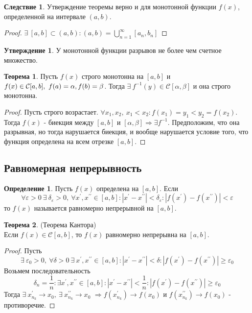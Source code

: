 \documentclass[a4paper, 12pt]{article}
\renewcommand{\epsilon}{\varepsilon}
\theoremstyle{definition}
\newtheorem*{definition}{Определение}
\newtheorem*{theorem}{Теорема}
\newtheorem*{consequense}{Следствие}
\newtheorem*{statement}{Утверждение}
\begin{document}
        \begin{consequense}
            Утверждение теоремы верно и для монотонной функции $f(x)$, определенной на интервале $(a,b)$.
        \end{consequense} 
        \begin{proof}
            $\exists\ [a,b]\subset (a,b): (a,b)=\bigcup\limits_{n=1}^{\infty}[a_n,b_n]$
        \end{proof}
        \begin{statement}
            У монотонной функции разрывов не более чем счетное множество.
        \end{statement} 
        \begin{theorem}
            Пусть $f(x)$ строго монотонна на $[a,b]$ и $f(x)\in\mathcal{C}[a,b],\ f(a)=\alpha,\\
            f(b)=\beta$. Тогда $\exists\ f^{-1}(y)\in\mathcal{C}[\alpha,\beta]$ и она строго монотонна. 
        \end{theorem} 
        \begin{proof}
            Пусть строго возрастает. $\forall x_1,x_2,\ x_1<x_2: f(x_1)=y_1<y_2=f(x_2)$. Тогда $f(x)$ - биекция между $[a,b]$ и $[\alpha,\beta] \Rightarrow \exists f^{-1}$. Предположим, что она разрывная, но тогда нарушается биекция, и вообще нарушается условие того, что функция определена на всем отрезке $[a,b]$.
        \end{proof} 
    \subsection{Равномерная непрерывность}
        \begin{definition}
            Пусть $f(x)$ определена на $[a,b]$. Если 
            \[\forall \epsilon>0\ \exists\ \delta_{\epsilon}>0,\ \forall x^{\prime}, x^{\prime\prime}\in [a,b]: |x^{\prime}-x^{\prime\prime}|<\delta_{\epsilon}: |f(x^{\prime})-f(x^{\prime\prime})|<\epsilon\] 
            то $f(x)$ называется равномерно непрерывной на $[a,b]$.
        \end{definition} 
        \begin{theorem} (Теорема Кантора)\\
            Если $f(x)\in \mathcal{C}[a,b]$, то $f(x)$ равномерно непрерывна на $[a,b]$.
        \end{theorem} 
        \begin{proof}
            Пусть 
            \[\exists\ \epsilon_0>0,\ \forall \delta>0\ \exists\ x^{\prime}, x^{\prime\prime}\in [a,b]: |x^{\prime}-x^{\prime\prime}|<\delta: |f(x^{\prime})-f(x^{\prime\prime})|\geq \epsilon_0\] 
            Возьмем последовательность 
            \[\delta_n=\frac{1}{n}: \exists x^{\prime},x^{\prime\prime}\in [a,b]: |x^{\prime}-x^{\prime\prime}|<\frac{1}{n}: |f(x^{\prime})-f(x^{\prime\prime})|\geq \epsilon_0\] 
            Тогда $\exists\ x_{n_k}^{\prime}\to x_0,\ \exists\ x_{n_k}^{\prime\prime}\to x_0$ $\Rightarrow f(x_{n_k}^{\prime})\to f(x_0)$ и $f(x_{n_k}^{\prime\prime})\to f(x_0)$ - противоречие.
        \end{proof}
\end{document}
